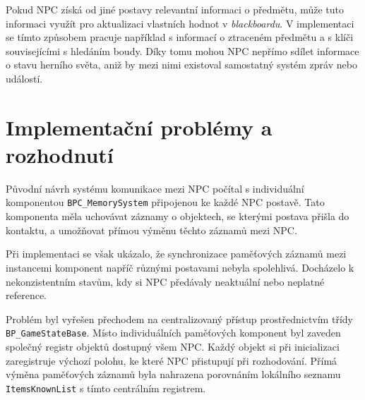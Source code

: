 Pokud NPC získá od jiné postavy relevantní informaci o předmětu, může tuto informaci využít pro aktualizaci vlastních hodnot v \textit{blackboardu}. 
V implementaci se tímto způsobem pracuje například s informací o ztraceném předmětu a s klíči souvisejícími s hledáním boudy. 
Díky tomu mohou NPC nepřímo sdílet informace o stavu herního světa, aniž by mezi nimi existoval samostatný systém zpráv nebo událostí.

\section{Implementační problémy a rozhodnutí}
\label{sec:problems_and_solutions}
Původní návrh systému komunikace mezi NPC počítal s individuální komponentou \texttt{BPC\_MemorySystem} připojenou ke každé NPC postavě. 
Tato komponenta měla uchovávat záznamy o objektech, se kterými postava přišla do kontaktu, a umožňovat přímou výměnu těchto záznamů mezi NPC.

Při implementaci se však ukázalo, že synchronizace paměťových záznamů mezi instancemi komponent napříč různými postavami nebyla spolehlivá. 
Docházelo k nekonzistentním stavům, kdy si NPC předávaly neaktuální nebo neplatné reference.

Problém byl vyřešen přechodem na centralizovaný přístup prostřednictvím třídy \texttt{BP\_GameStateBase}. 
Místo individuálních paměťových komponent byl zaveden společný registr objektů dostupný všem NPC. 
Každý objekt si při inicializaci zaregistruje výchozí polohu, ke které NPC přistupují při rozhodování. 
Přímá výměna paměťových záznamů byla nahrazena porovnáním lokálního seznamu \texttt{ItemsKnownList} s tímto centrálním registrem.



